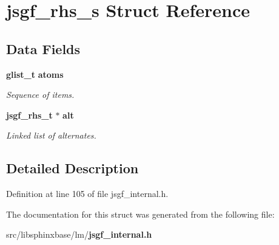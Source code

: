 \section{jsgf\-\_\-rhs\-\_\-s Struct Reference}
\label{structjsgf__rhs__s}
\subsection*{Data Fields}
\begin{DoxyCompactItemize}
\item 
{\bf glist\-\_\-t} {\bf atoms}\label{structjsgf__rhs__s_a53c517a31c83eb357764fb891bba7008}

\begin{DoxyCompactList}\small\item\em Sequence of items. \end{DoxyCompactList}\item 
{\bf jsgf\-\_\-rhs\-\_\-t} $\ast$ {\bf alt}\label{structjsgf__rhs__s_ad07cf44d48798d86633b37e9e6e67ff5}

\begin{DoxyCompactList}\small\item\em Linked list of alternates. \end{DoxyCompactList}\end{DoxyCompactItemize}


\subsection{Detailed Description}


Definition at line 105 of file jsgf\-\_\-internal.\-h.



The documentation for this struct was generated from the following file\-:\begin{DoxyCompactItemize}
\item 
src/libsphinxbase/lm/{\bf jsgf\-\_\-internal.\-h}\end{DoxyCompactItemize}
